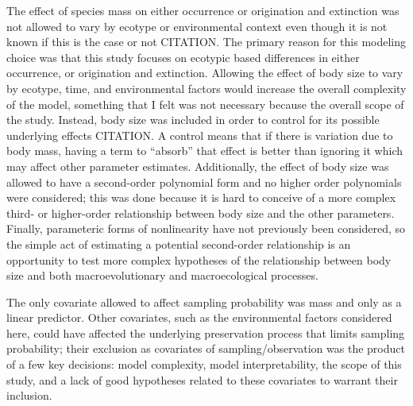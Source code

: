 \documentclass[12pt,letterpaper]{article}
\begin{document}
The effect of species mass on either occurrence or origination and extinction was not allowed to vary by ecotype or environmental context even though it is not known if this is the case or not CITATION. The primary reason for this modeling choice was that this study focuses on ecotypic based differences in either occurrence, or origination and extinction. Allowing the effect of body size to vary by ecotype, time, and environmental factors would increase the overall complexity of the model, something that I felt was not necessary because the overall scope of the study. Instead, body size was included in order to control for its possible underlying effects CITATION. A control means that if there is variation due to body mass, having a term to ``absorb'' that effect is better than ignoring it which may affect other parameter estimates. Additionally, the effect of body size was allowed to have a second-order polynomial form and no higher order polynomials were considered; this was done because it is hard to conceive of a more complex third- or higher-order relationship between body size and the other parameters. Finally, parameteric forms of nonlinearity have not previously been considered, so the simple act of estimating a potential second-order relationship is an opportunity to test more complex hypotheses of the relationship between body size and both macroevolutionary and macroecological processes.

The only covariate allowed to affect sampling probability was mass and only as a linear predictor. Other covariates, such as the environmental factors considered here, could have affected the underlying preservation process that limits sampling probability; their exclusion as covariates of sampling/observation was the product of a few key decisions: model complexity, model interpretability, the scope of this study, and a lack of good hypotheses related to these covariates to warrant their inclusion. %

\end{document}

